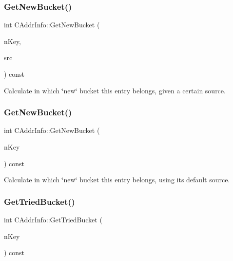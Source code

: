 \subsubsection{\texorpdfstring{Get\+New\+Bucket()}{GetNewBucket()}\hspace{0.1cm}{\footnotesize\ttfamily [1/2]}}
{\footnotesize\ttfamily int C\+Addr\+Info\+::\+Get\+New\+Bucket (\begin{DoxyParamCaption}\item[{const \mbox{\hyperlink{classuint256}{uint256}} \&}]{n\+Key,  }\item[{const \mbox{\hyperlink{class_c_net_addr}{C\+Net\+Addr}} \&}]{src }\end{DoxyParamCaption}) const}



Calculate in which \char`\"{}new\char`\"{} bucket this entry belongs, given a certain source. 

\mbox{\label{class_c_addr_info_a04ac79764971242edce1e82aefb2aea0}} 
\subsubsection{\texorpdfstring{Get\+New\+Bucket()}{GetNewBucket()}\hspace{0.1cm}{\footnotesize\ttfamily [2/2]}}
{\footnotesize\ttfamily int C\+Addr\+Info\+::\+Get\+New\+Bucket (\begin{DoxyParamCaption}\item[{const \mbox{\hyperlink{classuint256}{uint256}} \&}]{n\+Key }\end{DoxyParamCaption}) const\hspace{0.3cm}{\ttfamily [inline]}}



Calculate in which \char`\"{}new\char`\"{} bucket this entry belongs, using its default source. 

\mbox{\label{class_c_addr_info_a11e2712f11c0d92c75976e90f2c5003e}} 
\subsubsection{\texorpdfstring{Get\+Tried\+Bucket()}{GetTriedBucket()}}
{\footnotesize\ttfamily int C\+Addr\+Info\+::\+Get\+Tried\+Bucket (\begin{DoxyParamCaption}\item[{const \mbox{\hyperlink{classuint256}{uint256}} \&}]{n\+Key }\end{DoxyParamCaption}) const}



